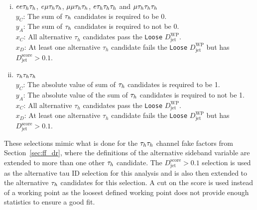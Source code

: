 \begin{enumerate}[i)]
   \item $ee\tau_{h}\tau_{h}$, $e\mu\tau_{h}\tau_{h}$, $\mu\mu\tau_{h}\tau_{h}$, $e\tau_{h}\tau_{h}\tau_{h}$ and $\mu\tau_{h}\tau_{h}\tau_{h}$  \\
     \indent $y_C$: The sum of $\tau_{h}$ candidates is required to be 0. \\
     \indent $y_A$: The sum of $\tau_{h}$ candidates is required to not be 0. \\
     \indent $x_C$: All alternative $\tau_h$ candidates pass the \texttt{Loose} $D_{\text{jet}}^{\text{WP}}$. \\
     \indent $x_D$: At least one alternative $\tau_h$ candidate fails the \texttt{Loose} $D_{\text{jet}}^{\text{WP}}$ but has $D_{\text{jet}}^{\text{score}} > 0.1$.
  \item $\tau_{h}\tau_{h}\tau_{h}$ \\
     \indent $y_C$: The absolute value of sum of $\tau_{h}$ candidates is required to be 1. \\
     \indent $y_A$: The absolute value of the sum of $\tau_{h}$ candidates is required to not be 1. \\
     \indent $x_C$: All alternative $\tau_h$ candidates pass the \texttt{Loose} $D_{\text{jet}}^{\text{WP}}$. \\
     \indent $x_D$: At least one alternative $\tau_h$ candidate fails the \texttt{Loose} $D_{\text{jet}}^{\text{WP}}$ but has $D_{\text{jet}}^{\text{score}} > 0.1$.
\end{enumerate}

These selections mimic what is done for the $\tau_{h}\tau_{h}$ channel fake factors from Section~\ref{sec:ff_dr}, where the definitions of the alternative sideband variable are extended to more than one other $\tau_{h}$ candidate.
The $D_{\text{jet}}^{\text{score}} > 0.1$ selection is used as the alternative tau ID selection for this analysis and is also then extended to the alternative $\tau_{h}$ candidates for this selection.
A cut on the score is used instead of a working point as the loosest defined working point does not provide enough statistics to ensure a good fit. \\

